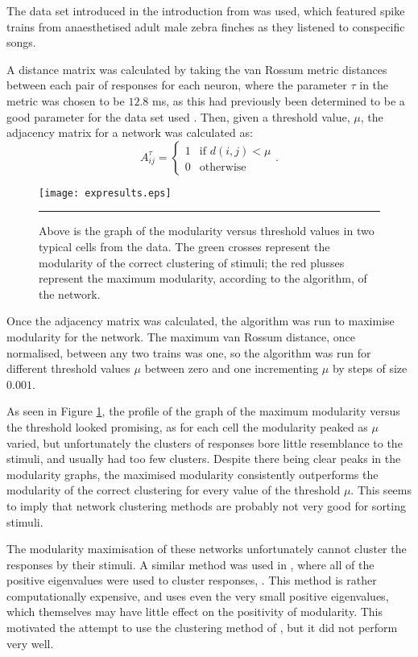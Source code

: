The data set introduced in the introduction from \citep{NarayanEtAl2006b} was used, which featured spike trains 
from anaesthetised adult male zebra finches as they listened to conspecific 
songs.

A distance matrix was calculated by taking the van Rossum metric distances between 
each pair of responses for each neuron, where the parameter $\tau$ in the metric was chosen to be $12.8$ ms, as this had previously been determined to be a good parameter for the data set used \citep{Houghton2009a}.    Then, given a threshold value, $\mu$, the adjacency matrix for a network was calculated as:
\begin{equation}
A^{\tau}_{ij} = \left\{ \begin{array}{ll} 1 & \mbox{if }d(i,j)<\mu \\
0 & \mbox{otherwise}
\end{array}\right. .
\end{equation}

\begin{figure}[h!tb]
  \centering
  \texttt{[image: expresults.eps]}
  \rule{31.5em}{0.5pt}
  \caption{Above is the graph of the modularity versus threshold values
    in two typical cells from the data.  The green crosses represent the 
    modularity of the correct clustering of stimuli; the red plusses represent 
    the maximum modularity, according to the algorithm, of the network.
      \label{graphs}}
\end{figure}

Once the adjacency matrix was calculated, the algorithm was run to 
maximise modularity for the network.  The maximum van Rossum 
distance, once normalised, between any two trains was one, so the algorithm was run for different 
threshold values $\mu$ between zero and one incrementing $\mu$ by steps of 
size $0.001$.

As seen in Figure \ref{graphs}, the profile of the graph of the maximum 
modularity versus the threshold looked promising, as for each cell the modularity peaked as $\mu$ varied, but unfortunately the clusters of responses bore little 
resemblance to the stimuli, and usually had too few clusters. Despite there being clear peaks in the modularity graphs, the maximised modularity consistently outperforms the modularity of the correct clustering for every value of the threshold $\mu$.  This seems to imply that network clustering methods are probably not very good for sorting stimuli.


The modularity maximisation of these networks unfortunately cannot cluster the responses by their stimuli. A similar method was used in \citep{Humphries2011a}, where all of the positive eigenvalues were used to 
cluster responses, . This method is 
rather computationally expensive, and uses even the very small positive 
eigenvalues, which themselves may have little effect on the positivity of modularity.  This motivated the attempt to use the clustering method of \citet{Newman2006b}, but it did not perform very well.

